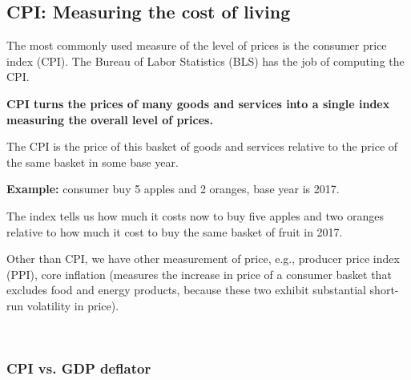 \documentclass[12pt]{article}
\begin{document}
\subsection{CPI: Measuring the cost of living}
The most commonly used measure of the level of prices is the consumer price index (CPI).
The Bureau of Labor Statistics (BLS) has the job of computing the CPI.

{\textbf {CPI turns the prices of many goods and services into a single index measuring
the overall level of prices.}}

The CPI is the price of this basket of goods and services relative to the price of 
the same basket in some base year.

{\textbf {Example:}} consumer buy 5 apples and 2 oranges, base year is 2017.

\begin{figure}[H]
\end{figure}

The index tells us how much it costs now to buy five apples and two
oranges relative to how much it cost to buy the same basket of fruit in 2017.

Other than CPI, we have other measurement of price, e.g., producer price index (PPI),
core inflation (measures the increase in price of a consumer basket that excludes 
food and energy products, because these two exhibit substantial short-run volatility
in price).




\noindent{}\\




\subsubsection{CPI vs. GDP deflator}
\end{document}
